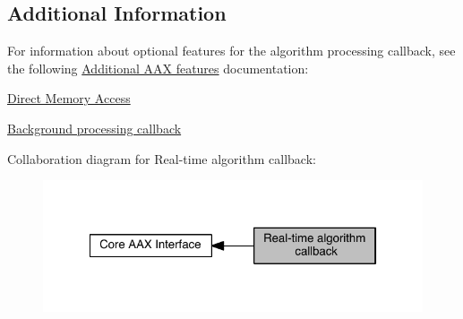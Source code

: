  \hypertarget{a00327_alg_seealso}{}\subsection{Additional Information}\label{a00327_alg_seealso}
 For information about optional features for the algorithm processing callback, see the following \hyperlink{a00332}{Additional A\+A\+X features} documentation\+:

 \begin{DoxyItemize}
\item \hyperlink{a00340}{Direct Memory Access} \item \hyperlink{a00341}{Background processing callback}\end{DoxyItemize}
 Collaboration diagram for Real-\/time algorithm callback\+:
\nopagebreak
\begin{figure}[H]
\begin{center}
\leavevmode
\includegraphics[width=322pt]{a00327}
\end{center}
\end{figure}
